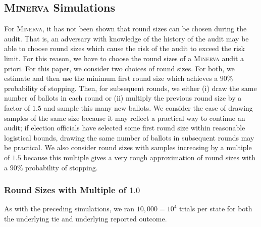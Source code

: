 \documentclass[runningheads]{llncs}
\newcommand{\Minerva}{\textsc{Minerva}\xspace}
\begin{document}

\subsection{\Minerva Simulations}
For \Minerva, it has not been shown that round sizes can be chosen
during the audit. That is, an adversary with knowledge of the history
of the audit may be able to choose round sizes which cause the 
risk of the audit to exceed the risk limit.
For this reason, we have to choose the round sizes of a \Minerva 
audit a priori.
For this paper, we consider two choices of round sizes.
For both, we estimate and then use the minimum first round size 
which achieves
a $90\%$ probability of stopping.
Then, for subsequent rounds, we either (i) 
draw the same number of ballots in each round or (ii)
multiply the previous round size by a factor of $1.5$ and 
sample this many new ballots.
We consider the case of drawing samples of the same size
because it may reflect a practical way to continue an
audit; if election officials have selected some first round size within
reasonable logistical bounds, drawing the same number of 
ballots in subsequent rounds may be practical.
We also consider round sizes with samples increasing by a multiple
of $1.5$ because this multiple gives a very rough approximation of 
round sizes with a $90\%$ probability of stopping.

\subsubsection{Round Sizes with Multiple of $1.0$}

As with the preceding simulations, we ran $10,000=10^4$ trials
per state for both the underlying tie and underlying reported
outcome.
\end{document}
